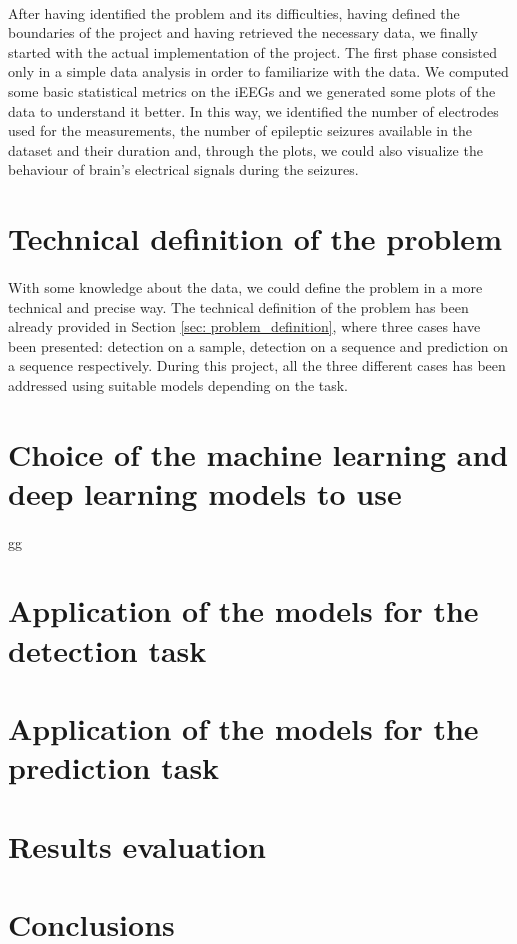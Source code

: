 \paragraph{} After having identified the problem and its difficulties, having defined the boundaries of the project and having retrieved the necessary data, we finally started with the actual implementation of the project. The first phase consisted only in a simple data analysis in order to familiarize with the data. We computed some basic statistical metrics on the iEEGs and we generated some plots of the data to understand it better. In this way, we identified the number of electrodes used for the measurements, the number of epileptic seizures available in the dataset and their duration and, through the plots, we could also visualize the behaviour of brain's electrical signals during the seizures.


\section{Technical definition of the problem} \label{sec: technical_definition_problem}
\paragraph{} With some knowledge about the data, we could define the problem in a more technical and precise way. The technical definition of the problem has been already provided in Section \ref{sec: problem_definition}, where three cases have been presented: detection on a sample, detection on a sequence and prediction on a sequence respectively. During this project, all the three different cases has been addressed using suitable models depending on the task.


\section{Choice of the machine learning and deep learning models to use} \label{sec: choice_models_to_use}
\paragraph{} gg

\section{Application of the models for the detection task}
\section{Application of the models for the prediction task}
\section{Results evaluation}
\section{Conclusions}
